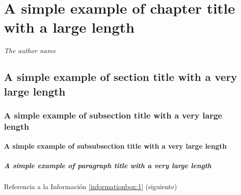 \chapter{A simple example of chapter title with a large length}

\begin{phrasebox}{}{\textit{The author name}}
\label{phrasebox:2}
\textit{\lipsum[1][1-3]}
\end{phrasebox}

\lipsum[1][1-4]



\section{A simple example of section title with a very large length}

\lipsum[1][1-5] 

\subsection{A simple example of subsection title with a very large length}

\lipsum[1][1-5] 

\subsubsection{A simple example of subsubsection title with a very large length}

\lipsum[1][1-5] 

\paragraph{A simple example of paragraph title with a very large length}

\lipsum[1][1-5] 

\OrnamentalBreak

\lipsum[1][1-5] 


Referencia a la Información \ref{informationbox:1} (siguiente)

\begin{informationbox}[Título A]
\label{informationbox:1}
\lipsum[1][1-3] 
\end{informationbox}

\lipsum[1][1-5] 


